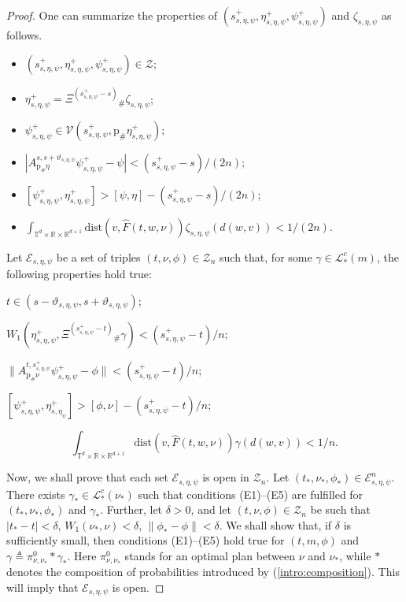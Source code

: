 \documentclass[a4paper,12pt]{article}
\newcommand{\rdp}{\mathbb{R}^{d+1}}
\newcommand{\tdr}{\mathbb{T}^{d}\times\mathbb{R}}
\begin{document}
\begin{proof}
	One can summarize the properties of $(s^+_{s,\eta,\psi},\eta^+_{s,\eta,\psi},\psi^+_{s,\eta,\psi})$ and $\zeta_{s,\eta,\psi}$ as follows. 
	\begin{itemize}
		\item $(s^+_{s,\eta,\psi},\eta^+_{s,\eta,\psi},\psi^+_{s,\eta,\psi})\in \mathcal{Z}$;
		\item ${\eta}^+_{s,\eta,\psi}=\Xi^{(s^+_{s,\eta,\psi}-s)}{}_\#\zeta_{s,\eta,\psi}$;
		\item $\psi^+_{s,\eta,\psi}\in\mathcal{V}(s^+_{s,\eta,\psi},\mathrm{p}_\#{\eta}^+_{s,\eta,\psi})$;
		\item $|A^{s,s+\vartheta_{s,\eta,\psi}}_{\mathrm{p}_\#{\eta}}\psi^+_{s,\eta,\psi}-\psi|< (s^+_{s,\eta,\psi}-s)/(2n)$;
		\item $[\psi^+_{s,\eta,\psi},{\eta}^+_{s,\eta,\psi}]> [\psi,\eta]-(s^+_{s,\eta,\psi}-s)/(2n)$;
		\item $\int_{\tdr\times\rdp}\mathrm{dist}(v,\widehat{F}(t,w,\nu))\zeta_{s,\eta,\psi}(d(w,v))< 1/(2n).$
	\end{itemize}
	
	Let $\mathcal{E}_{s,\eta,\psi}$ be a set of triples $(t,\nu,\phi)\in \mathcal{Z}_n $ such that,   for some $\gamma\in\mathcal{L}_*^c(m)$, the following properties hold true:
	\begin{list}{(E)}{}
		\item\label{condE:time} $t\in (s-\vartheta_{s,\eta,\psi},s+\vartheta_{s,\eta,\psi})$;
		\item\label{condE:W} $W_1(\eta^+_{s,\eta,\psi},\Xi^{(s^+_{s,\eta,\psi}-t)}{}_\#\gamma)<(s^+_{s,\eta,\psi}-t)/n$;
		\item\label{condE:A} $\|A^{t,s^+_{s,\eta,\psi}}_{\mathrm{p}_\#\nu}\psi^{+}_{s,\eta,\psi}-\phi\|<(s^+_{s,\eta,\psi}-t)/n$;
		\item\label{condE:int} $[\psi^+_{s,\eta,\psi},\eta^+_{s,\eta_\psi}]> [\phi,\nu]-(s^+_{s,\eta,\psi}-t)/n$;
		\item\label{condE:F} $$\int_{\tdr\times\rdp}\mathrm{dist}(v,\widehat{F}(t,w,\nu))\gamma(d(w,v))<1/n. $$
	\end{list}
	
	Now, we shall prove that each set $\mathcal{E}_{s,\eta,\psi}$ is open in $\mathcal{Z}_n$.
	Let $(t_*,\nu_*,\phi_*)\in \mathcal{E}^n_{s,\eta,\psi}$. There exists  $\gamma_*\in \mathcal{L}_*^c(\nu_*)$ such that conditions (E1)--(E5) are fulfilled for $(t_*,\nu_*,\phi_*)$ and $\gamma_*$. Further, let $\delta>0$, and let $(t,\nu,\phi)\in \mathcal{Z}_n$ be such that $|t_*-t|<\delta$, $W_1(\nu_*,\nu)<\delta$, $\|\phi_*-\phi\|<\delta$. We shall show that, if $\delta$ is sufficiently small, then conditions (E1)--(E5) hold true for $(t,m,\phi)$ and
	$\gamma\triangleq \pi^0_{\nu,\nu_*}*\gamma_*$. Here $\pi^0_{\nu,\nu_*}$ stands for an optimal plan between $\nu$ and $\nu_*$, while $*$ denotes the  composition of probabilities  introduced by (\ref{intro:composition}). This will imply that $\mathcal{E}_{s,\eta,\psi}$ is open.
	

\end{proof}
\end{document}
